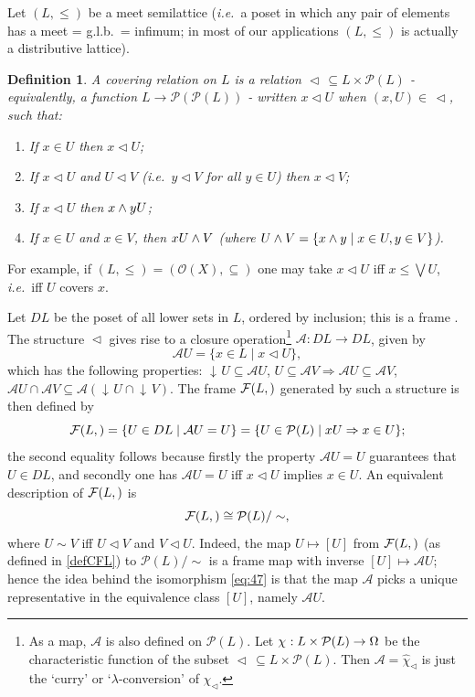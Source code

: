 \documentclass[12pt]{article}
\newcommand{\downset}{\ensuremath{\mathop{\downarrow\!}}}
\newcommand{\drie}{\vartriangleleft}
\newcommand{\beq}{\begin{equation}}
\newcommand{\eeq}{\end{equation}}
\newcommand{\raw}{\rightarrow} \newcommand{\rat}{\mapsto}
\newcommand{\x}{\times} \newcommand{\hb}{\hbar}
\newcommand{\er}{\eqref}
\newcommand{\lm}{\lambda} \newcommand{\Lm}{\Lambda}
\newcommand{\ch}{\chi} \newcommand{\ps}{\psi} \newcommand{\Ps}{\Psi}
\newcommand{\CO}{{\mathcal O}} \newcommand{\CP}{{\mathcal P}}
\newcommand{\ie}{\textit{i.e.}}
\newtheorem{definition}[theorem]{Definition}
\begin{document}
Let $(L,\leqslant)$  be a meet semilattice (\ie\ a poset in which any pair of elements has a meet = g.l.b.\ = infimum; in most of our applications $(L,\leqslant)$ is actually a distributive lattice).
\begin{definition}\label{def:cover}
A {\it covering relation} on $L$ is a relation $\drie\,\subseteq L\x\CP(L)$ -
equivalently, a function $L\raw \CP(\CP(L))$ -
 written $x\drie U$ when $(x,U)\in\,\drie$, such that:
 \begin{enumerate}
\item If $x\in U$ then $x\drie U$;
\item If $x\drie U$ and $U\drie V$ (\ie\ $y\drie V$ for all $y\in U$) then $x\drie V$;
\item If $x\drie U$ then $x\wed y\drie U$;
\item If  $x\in U$ and  $x\in V$, then $x\drie U\wed V$ (where $U\wedge V=\{x\wedge y\mid x\in U, y\in V\}$).
\end{enumerate}
\end{definition}
For example, if $(L,\leqslant)=(\CO(X),\subseteq)$ one may take $x\drie U$ iff $x\leqslant\bigvee U$, \ie\ iff $U$ covers
$x$.

Let  $DL$ be the poset of all lower sets in $L$, ordered by inclusion; this is a frame \cite[\S 1.2]{johnstone82}. 
The structure $\drie$ gives rise to a closure operation\footnote{As a map, $\mathcal{A}$ is also defined on $\CP(L)$. 
Let $\ch_{\drie}:L\x\CP(L)\raw\Om$
be the characteristic function of the subset $\drie\,\subseteq L\x\CP(L)$. Then $\mathcal{A}=\hat{\ch}_{\drie}$ is just the `curry' or `$\lm$-conversion' of $\ch_{\drie}$.}
$\mathcal{A}: DL\raw DL$,  given by
\beq \mathcal{A} U=\{x\in L\mid x\drie U\}, \label{clop}\eeq
which has the following properties: $\downset U\subseteq \mathcal{A}U$,
$U\subseteq \mathcal{A}V\Rightarrow \mathcal{A}U\subseteq \mathcal{A}V$,
  $\mathcal{A}U\cap \mathcal{A}V\subseteq \mathcal{A}(\downset U \cap \downset V)$.   The frame $\CF(L,\drie)$ generated by such a structure is then defined by
\beq \CF(L,\drie)=\{U\in DL\mid \mathcal{A}U=U\}=\{U\in \CP(L)\mid x\drie U\Raw x\in U\};
\label{defCFL}
\eeq
the second equality follows because firstly  the property $\mathcal{A}U=U$ guarantees that $U\in DL$, and secondly one has $\mathcal{A}U=U$ iff  $x\drie U$ implies  $x\in U$.
An equivalent description of  $\CF(L,\drie)$ is
\beq \CF(L,\drie)\cong
\CP(L)/\sim,\label{eq:47} \eeq
 where $U\sim V$ iff $U\drie V$ and  $V\drie U$.  Indeed, the map $U\mapsto [U]$ from
 $ \CF(L,\drie)$ (as defined in \er{defCFL}) to $\CP(L)/\sim$ is a frame map with inverse
 $[U]\mapsto \mathcal{A}U$; hence the idea behind the isomorphism \er{eq:47} is that the map $\mathcal{A}$ picks a unique representative 
 in the equivalence class $[U]$, namely $\mathcal{A}U$.
 
\end{document}
